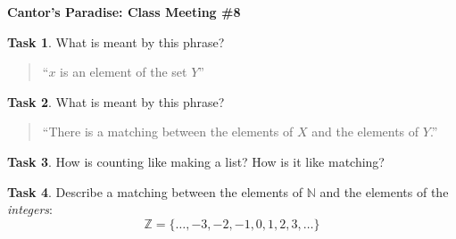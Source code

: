 \documentclass[12pt]{amsart}
\theoremstyle{definition}
\newtheorem{task}{Task}
\begin{document}
\begin{center}
\textbf{\Huge
Cantor's Paradise: Class Meeting \#8
}
\end{center}


\vspace{.5in}

\begin{task}
What is meant by this phrase?
\begin{quote}
``$x$ is an element of the set $Y$''
\end{quote}
\end{task}

\vspace{3in}

\begin{task}
What is meant by this phrase?
\begin{quote}
``There is a matching between the elements of $X$ and the elements of $Y$.''
\end{quote}
\end{task}

\clearpage

\begin{task}
How is counting like making a list? How is it like matching?
\end{task}

\vspace{3.5in}

\begin{task}
Describe a matching between the elements of $\mathbb{N}$ and the elements of the \emph{integers}:
\[
\mathbb{Z} = \{ \ldots, -3, -2, -1, 0, 1, 2, 3, \ldots \}
\]
\end{task}
\end{document}
